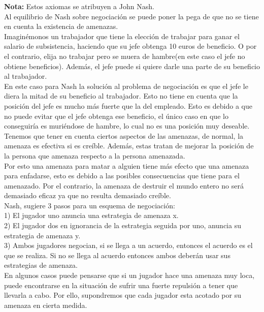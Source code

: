 \documentclass[10pt,a4paper]{book}
\begin{document}
\textbf{Nota:} Estos axiomas se atribuyen a John Nash.\\

Al equilibrio de Nash sobre negociación se puede poner la pega de que no se tiene en cuenta la existencia de amenazas. \\
Imaginémonos un trabajador que tiene la elección de trabajar para ganar el salario de subsistencia, haciendo que su jefe obtenga 10 euros de beneficio. O por el contrario, elija no trabajar pero se muera de hambre(en este caso el jefe no obtiene beneficios). Además, el jefe puede si quiere darle una parte de su beneficio al trabajador.\\
En este caso para Nash la solución al problema de negociación es que el jefe le diera la mitad de su beneficio al trabajador. Esto no tiene en cuenta que la posición del jefe es mucho más fuerte que la del empleado. Esto es debido a que no puede evitar que el jefe obtenga ese beneficio, el único caso en que lo conseguiría es muriéndose de hambre, lo cual no es una posición muy deseable.\\

Tenemos que tener en cuenta ciertos aspectos de las amenazas, de normal, la amenaza es efectiva si es creíble. Además, estas tratan de mejorar la posición de la persona que amenaza respecto a la persona amenazada.\\

Por esto una amenaza para matar a alguien tiene más efecto que una amenaza para enfadarse, esto es debido a las posibles consecuencias que tiene para el amenazado. Por el contrario, la amenaza de destruir el mundo entero no será demasiado eficaz ya que no resulta demasiado creíble.\\

Nash, sugiere 3 pasos para un esquema de negociación:\\
1)	El jugador uno anuncia una estrategia de amenaza x. \\
2)	El jugador dos en ignorancia de la estrategia seguida por uno, anuncia su estrategia de amenaza y.\\
3)	Ambos jugadores negocian, si se llega a un acuerdo, entonces el acuerdo es el que se realiza. Si no se llega al acuerdo entonces ambos deberán usar sus estrategias de amenaza.\\

En algunos casos puede pensarse que si un jugador hace una amenaza muy loca, puede encontrarse en la situación de sufrir una fuerte repulsión a tener que llevarla a cabo. Por ello, supondremos que cada jugador esta acotado por su amenaza en cierta medida.\\
\end{document}
